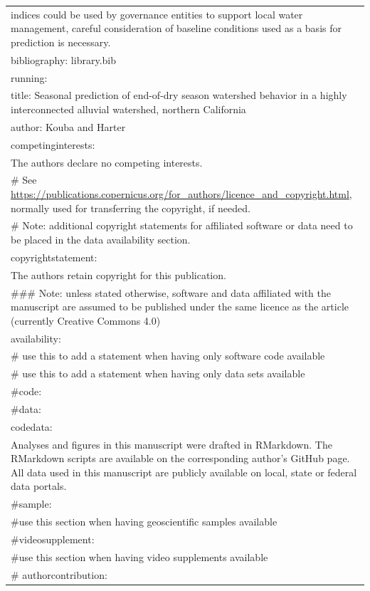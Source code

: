 \documentclass[
]{article}
\begin{document}
\begin{longtable}[]{@{}l@{}}
indices could be used by governance entities to support local water
management, careful consideration of baseline conditions used as a basis
for prediction is necessary. \\
bibliography: library.bib \\
running: \\
title: Seasonal prediction of end-of-dry season watershed behavior in a
highly interconnected alluvial watershed, northern California \\
author: Kouba and Harter \\
competinginterests: \textbar{} \\
The authors declare no competing interests. \\
\# See
\url{https://publications.copernicus.org/for_authors/licence_and_copyright.html},
normally used for transferring the copyright, if needed. \\
\# Note: additional copyright statements for affiliated software or data
need to be placed in the data availability section. \\
copyrightstatement: \textbar{} \\
The authors retain copyright for this publication. \\
\#\#\# Note: unless stated otherwise, software and data affiliated with
the manuscript are assumed to be published under the same licence as the
article (currently Creative Commons 4.0) \\
availability: \\
\# use this to add a statement when having only software code
available \\
\# use this to add a statement when having only data sets available \\
\#code: \textbar{} \\
\#data: \textbar{} \\
codedata: \textbar{} \\
Analyses and figures in this manuscript were drafted in RMarkdown. The
RMarkdown scripts are available on the corresponding author's GitHub
page. All data used in this manuscript are publicly available on local,
state or federal data portals. \\
\#sample: \textbar{} \\
\#use this section when having geoscientific samples available \\
\#videosupplement: \textbar{} \\
\#use this section when having video supplements available \\
\# authorcontribution: \textbar{} \\

\end{longtable}
\end{document}
